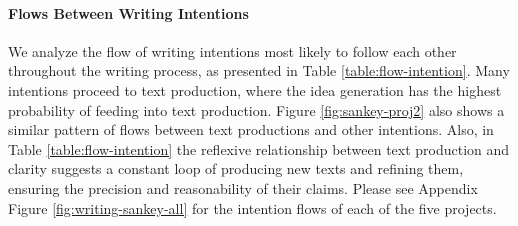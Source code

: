 \paragraph{Flows Between Writing Intentions} 

We analyze the flow of writing intentions most likely to follow each other throughout the writing process, as presented in Table \ref{table:flow-intention}. Many intentions proceed to text production, where the idea generation has the highest probability of feeding into text production. Figure \ref{fig:sankey-proj2} also shows a similar pattern of flows between text productions and other intentions. Also, in Table \ref{table:flow-intention} the reflexive relationship between text production and clarity suggests a constant loop of producing new texts and refining them, ensuring the precision and reasonability of their claims. Please see Appendix Figure \ref{fig:writing-sankey-all} for the intention flows of each of the five projects.



